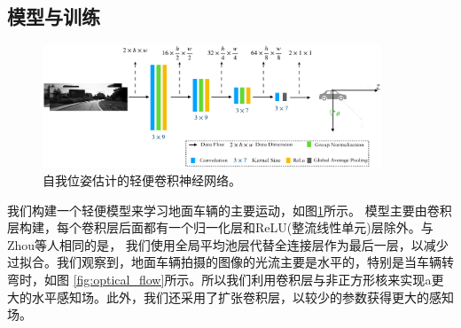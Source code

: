 \subsection{模型与训练}
\label{sec:model}
\begin{figure}[t]
    \centering
    \includegraphics[width=0.9\textwidth]{datavo/network_structure_2-crop.pdf}
    \caption{自我位姿估计的轻便卷积神经网络。}
    \label{fig:nerwork_structure}
\end{figure}
我们构建一个轻便模型来学习地面车辆的主要运动，如图\ref{fig:nerwork_structure}所示。
模型主要由卷积层构建，每个卷积层后面都有一个归一化层\cite{wu2018group}和ReLU{(整流线性单元)层}除外。与Zhou等人相同的是\cite{zhou2017unsupervised}，
我们使用全局平均池层\cite{lin2013network}代替全连接层作为最后一层，以减少过拟合。我们观察到，地面车辆拍摄的图像的光流主要是水平的，特别是当车辆转弯时，如图
\ref{fig:optical_flow}所示。所以我们利用卷积层与非正方形核来实现{a}更大的水平感知场。此外，我们还采用了扩张卷积层\cite{yu2015multi}，以较少的参数获得更大的感知场。

